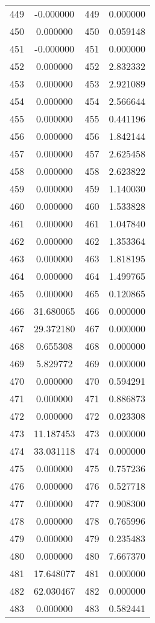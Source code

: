 \documentclass[12pt]{article}
\begin{document}
\begin{longtable}{@{}cccc@{}}
449 & -0.000000 & 449 & 0.000000 \\
450 & 0.000000 & 450 & 0.059148 \\
451 & -0.000000 & 451 & 0.000000 \\
452 & 0.000000 & 452 & 2.832332 \\
453 & 0.000000 & 453 & 2.921089 \\
454 & 0.000000 & 454 & 2.566644 \\
455 & 0.000000 & 455 & 0.441196 \\
456 & 0.000000 & 456 & 1.842144 \\
457 & 0.000000 & 457 & 2.625458 \\
458 & 0.000000 & 458 & 2.623822 \\
459 & 0.000000 & 459 & 1.140030 \\
460 & 0.000000 & 460 & 1.533828 \\
461 & 0.000000 & 461 & 1.047840 \\
462 & 0.000000 & 462 & 1.353364 \\
463 & 0.000000 & 463 & 1.818195 \\
464 & 0.000000 & 464 & 1.499765 \\
465 & 0.000000 & 465 & 0.120865 \\
466 & 31.680065 & 466 & 0.000000 \\
467 & 29.372180 & 467 & 0.000000 \\
468 & 0.655308 & 468 & 0.000000 \\
469 & 5.829772 & 469 & 0.000000 \\
470 & 0.000000 & 470 & 0.594291 \\
471 & 0.000000 & 471 & 0.886873 \\
472 & 0.000000 & 472 & 0.023308 \\
473 & 11.187453 & 473 & 0.000000 \\
474 & 33.031118 & 474 & 0.000000 \\
475 & 0.000000 & 475 & 0.757236 \\
476 & 0.000000 & 476 & 0.527718 \\
477 & 0.000000 & 477 & 0.908300 \\
478 & 0.000000 & 478 & 0.765996 \\
479 & 0.000000 & 479 & 0.235483 \\
480 & 0.000000 & 480 & 7.667370 \\
481 & 17.648077 & 481 & 0.000000 \\
482 & 62.030467 & 482 & 0.000000 \\
483 & 0.000000 & 483 & 0.582441 \\

\end{longtable}
\end{document}

